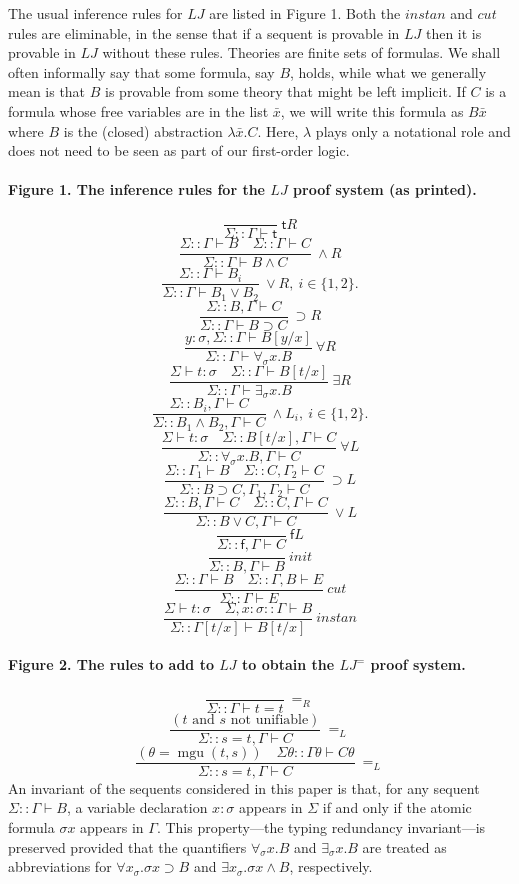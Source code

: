 \documentclass[10pt,a4paper]{article}
\newcommand{\pmLJ}{\mathit{LJ}}
\newcommand{\pmt}{\mathsf t}\newcommand{\pmf}{\mathsf f}
\newcommand{\pmseq}[3]{#1\mathbin{::}#2\vdash #3}
\newcommand{\pmbx}{\bar x}\newcommand{\pmby}{\bar y}
\begin{document}
The usual inference rules for $\pmLJ$ are listed in Figure 1. Both the $\mathit{instan}$ and $\mathit{cut}$ rules are eliminable, in the sense that if a sequent is provable in $\pmLJ$ then it is provable in $\pmLJ$ without these rules.
Theories are finite sets of formulas. We shall often informally say that some formula, say $B$, holds, while what we generally mean is that $B$ is provable from some theory that might be left implicit.
If $C$ is a formula whose free variables are in the list $\pmbx$, we will write this formula as $B\pmbx$ where $B$ is the (closed) abstraction $\lambda\pmbx.C$. Here, $\lambda$ plays only a notational role and does not need to be seen as part of our first-order logic.
\paragraph{Figure 1. The inference rules for the $\pmLJ$ proof system (as printed).}
\[\frac{}{\pmseq\Sigma\Gamma\pmt}\ \pmt R\]
\[
\frac{\pmseq\Sigma\Gamma B\quad\pmseq\Sigma\Gamma C}{\pmseq\Sigma\Gamma{B\wedge C}}\ \wedge R\]
\[
\frac{\pmseq\Sigma\Gamma{B_i}}{\pmseq\Sigma\Gamma{B_1\vee B_2}}\ \vee R,\ i\in\{1,2\}.\]
\[\frac{\pmseq\Sigma{B,\Gamma}C}{\pmseq\Sigma\Gamma{B\supset C}}\ \supset R\]
\[
\frac{\pmseq{y:\sigma,\Sigma}\Gamma{B[y/x]}}{\pmseq\Sigma\Gamma{\forall_\sigma x.B}}\ \forall R\]
\[\frac{\Sigma\vdash t:\sigma\quad\pmseq\Sigma\Gamma{B[t/x]}}{\pmseq\Sigma\Gamma{\exists_\sigma x.B}}\ \exists R\]
\[
\frac{\pmseq\Sigma{B_i,\Gamma}C}{\pmseq\Sigma{B_1\wedge B_2,\Gamma}C}\ \wedge L_i,\ i\in\{1,2\}.\]
\[\frac{\Sigma\vdash t:\sigma\quad\pmseq\Sigma{B[t/x],\Gamma}C}{\pmseq\Sigma{\forall_\sigma x.B,\Gamma}C}\ \forall L\]
\[\frac{\pmseq\Sigma{\Gamma_1}B\quad\pmseq\Sigma{C,\Gamma_2}C}{\pmseq\Sigma{B\supset C,\Gamma_1,\Gamma_2}C}\ \supset L\]
\[
\frac{\pmseq\Sigma{B,\Gamma}C\quad\pmseq\Sigma{C,\Gamma}C}{\pmseq\Sigma{B\vee C,\Gamma}C}\ \vee L\]
\[
\frac{}{\pmseq\Sigma{\pmf,\Gamma}C}\ \pmf L\]
\[\frac{}{\pmseq\Sigma{B,\Gamma}B}\ \mathit{init}\]
\[
\frac{\pmseq\Sigma\Gamma B\quad\pmseq\Sigma{\Gamma,B}E}{\pmseq\Sigma\Gamma E}\ \mathit{cut}\]
\[\frac{\Sigma\vdash t:\sigma\quad\pmseq{\Sigma,x:\sigma}\Gamma B}{\pmseq\Sigma{\Gamma[t/x]}{B[t/x]}}\ \mathit{instan}\]
\paragraph{Figure 2. The rules to add to $\pmLJ$ to obtain the $\pmLJ^=$ proof system.}
\[\frac{}{\pmseq\Sigma\Gamma{t=t}}\ =_R\]
\[
\frac{(t\text{ and }s\text{ not unifiable})}{\pmseq\Sigma{s=t,\Gamma}C}\ =_L\]
\[\frac{(\theta=\operatorname{mgu}(t,s))\quad\pmseq{\Sigma\theta}{\Gamma\theta}{C\theta}}{\pmseq\Sigma{s=t,\Gamma}C}\ =_L\]
An invariant of the sequents considered in this paper is that, for any sequent $\pmseq\Sigma\Gamma B$, a variable declaration $x:\sigma$ appears in $\Sigma$ if and only if the atomic formula $\sigma x$ appears in $\Gamma$. This property---the typing redundancy invariant---is preserved provided that the quantifiers $\forall_\sigma x.B$ and $\exists_\sigma x.B$ are treated as abbreviations for $\forall x_\sigma.\sigma x\supset B$ and $\exists x_\sigma.\sigma x\wedge B$, respectively.
\end{document}

